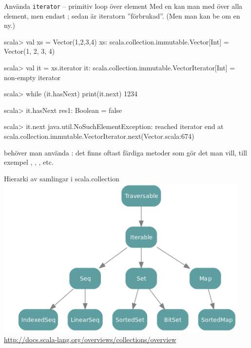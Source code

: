 \begin{Slide}{Använda \texttt{iterator} -- primitiv loop över element}\SlideFontSmall
Med en  kan man  med  över alla element, men endast ; sedan är iteratorn ''förbrukad''. (Men man kan be om en ny.)
\begin{REPL}
scala> val xs = Vector(1,2,3,4)
xs: scala.collection.immutable.Vector[Int] = Vector(1, 2, 3, 4)

scala> val it = xs.iterator
it: scala.collection.immutable.VectorIterator[Int] = non-empty iterator

scala> while (it.hasNext) print(it.next)
1234

scala> it.hasNext
res1: Boolean = false

scala> it.next
java.util.NoSuchElementException: reached iterator end
  at scala.collection.immutable.VectorIterator.next(Vector.scala:674)
\end{REPL}
 behöver man  använda : det finns oftast färdiga metoder som gör det man vill, till exempel , , ,  etc.
\end{Slide}







\begin{Slide}{Hierarki av samlingar i scala.collection}\SlideFontTiny
\includegraphics[width=0.95\textwidth]{../img/collection/collection-traits}\\
\url{http://docs.scala-lang.org/overviews/collections/overview}
\end{Slide}




